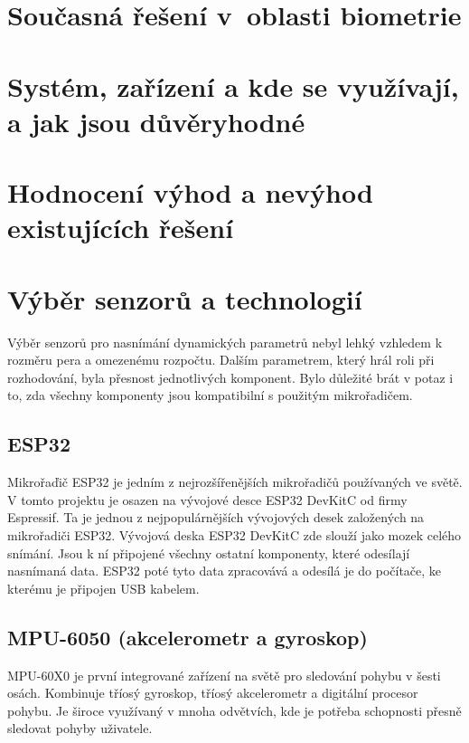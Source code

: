 \section{Současná řešení v~oblasti biometrie}


\section{Systém, zařízení a kde se využívají, a jak jsou důvěryhodné}


\section{Hodnocení výhod a nevýhod existujících řešení}


\section{Výběr senzorů a technologií}
Výběr senzorů pro nasnímání dynamických parametrů nebyl lehký vzhledem k rozměru pera a omezenému rozpočtu. %
Dalším parametrem, který hrál roli při rozhodování, byla přesnost jednotlivých komponent.                   %
Bylo důležité brát v potaz i to, zda všechny komponenty jsou kompatibilní s použitým mikrořadičem.          %

\subsection*{ESP32}
Mikrořaďič ESP32 je jedním z nejrozšířenějších mikrořadičů používaných ve světě.                            %
V tomto projektu je osazen na vývojové desce ESP32 DevKitC od firmy Espressif.                              %
Ta je jednou z nejpopulárnějších vývojových desek založených na mikrořadiči ESP32.                          %
Vývojová deska ESP32 DevKitC zde slouží jako mozek celého snímání.                                          %
Jsou k ní připojené všechny ostatní komponenty, které odesílají nasnímaná data.                             %
ESP32 poté tyto data zpracovává a odesílá je do počítače, ke kterému je připojen USB kabelem.               %

\subsection*{MPU-6050 (akcelerometr a gyroskop)}
MPU-60X0 je první integrované zařízení na světě pro sledování pohybu v šesti osách.                 %
Kombinuje tříosý gyroskop, tříosý akcelerometr a digitální procesor pohybu.                         %
Je široce využívaný v mnoha odvětvích, kde je potřeba schopnosti přesně sledovat pohyby uživatele.  %

